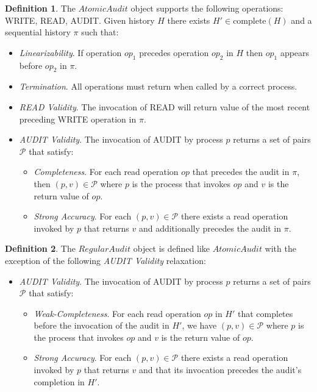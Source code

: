 \documentclass[11pt]{article}
\theoremstyle{definition}
\newtheorem{definition}{Definition}
\begin{document}
\begin{definition}
The $AtomicAudit$ object supports the following operations: \mbox{WRITE}, \mbox{READ}, \mbox{AUDIT}. Given history $H$ there exists $H'\in \mbox{complete}(H)$ and a sequential history $\pi$ such that:
\begin{itemize}
\item \textit{Linearizability}. If operation $op_1$ precedes operation $op_2$ in $H$ then $op_1$ appears before $op_2$ in $\pi$.
  \item \textit{Termination}. All operations must return when called by a correct process.
  \item \textit{\mbox{READ} Validity}. The invocation of \mbox{READ} will return value of the most recent preceding WRITE operation in $\pi$.
  \item \textit{\mbox{AUDIT} Validity}.  The invocation of \mbox{AUDIT} by process $p$ returns a set of pairs $\mathcal{P}$ that satisfy:
  \begin{itemize}
  \item \textit{Completeness}. For each read operation $op$ that precedes the audit in $\pi$, then $(p,v)\in \mathcal{P}$ where $p$ is the process that invokes $op$ and $v$ is the return value of $op$.
  \item \textit{Strong Accuracy}. For each $(p,v)\in \mathcal{P}$ there exists a read operation invoked by $p$ that returns $v$ and additionally precedes the audit in $\pi$.

\end{itemize}

\end{itemize}

\end{definition}


\begin{definition}
The $RegularAudit$ object is defined like $AtomicAudit$ with the exception of the following \textit{\mbox{AUDIT} Validity} relaxation:
\begin{itemize}
  \item \textit{\mbox{AUDIT} Validity}.  The invocation of \mbox{AUDIT} by process $p$ returns a set of pairs $\mathcal{P}$ that satisfy:
  \begin{itemize}
  \item \textit{Weak-Completeness}. For each read operation $op$ in $H'$ that completes before the invocation of the audit in $H'$, we have $(p,v)\in \mathcal{P}$ where $p$ is the process that invokes $op$ and $v$ is the return value of $op$.
  \item \textit{Strong Accuracy}. For each $(p,v)\in \mathcal{P}$ there exists a read operation invoked by $p$ that returns $v$ and that its invocation precedes the audit's completion in $H'$.

\end{itemize}

\end{itemize}

\end{definition}
\end{document}
